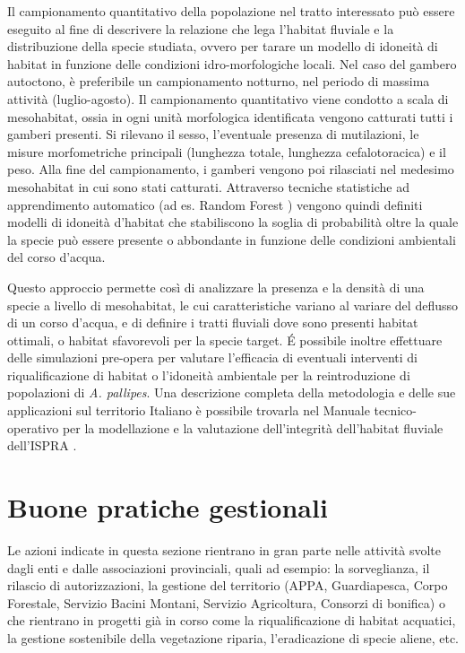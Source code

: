 \documentclass[11pt,a4paper,italian,twoside,openany]{memoir}
\begin{document}
Il campionamento quantitativo della popolazione nel tratto interessato può essere eseguito al fine di descrivere la relazione che lega l'habitat fluviale e la distribuzione della specie studiata, ovvero per tarare un modello di idoneità di habitat in funzione delle condizioni idro-morfologiche locali. Nel caso del gambero autoctono, è preferibile un campionamento notturno, nel periodo di massima attività (luglio-agosto). Il campionamento quantitativo viene condotto a scala di mesohabitat, ossia in ogni unità morfologica identificata vengono catturati tutti i gamberi presenti. Si rilevano il sesso, l'eventuale presenza di mutilazioni, le misure morfometriche principali (lunghezza totale, lunghezza cefalotoracica) e il peso. Alla fine del campionamento, i gamberi vengono poi rilasciati nel medesimo mesohabitat in cui sono stati catturati. Attraverso tecniche statistiche ad apprendimento automatico (ad es. Random Forest \cite{Breiman 2001}) vengono quindi definiti modelli di idoneità d'habitat che stabiliscono la soglia di probabilità oltre la quale la specie può essere presente o abbondante in funzione delle condizioni ambientali del corso d'acqua. 

Questo approccio permette così di analizzare la presenza e la densità di una specie a livello di mesohabitat, le cui caratteristiche variano al variare del deflusso di un corso d'acqua, e di definire i tratti fluviali dove sono presenti habitat ottimali, o habitat sfavorevoli per la specie target. É possibile inoltre effettuare delle simulazioni pre-opera per valutare l'efficacia di eventuali interventi di riqualificazione di habitat o l'idoneità ambientale per la reintroduzione di popolazioni di \emph{A. pallipes}. Una descrizione completa della metodologia e delle sue applicazioni sul territorio Italiano è possibile trovarla nel Manuale tecnico-operativo per la modellazione e la valutazione dell'integrità dell'habitat fluviale dell'ISPRA \cite{Vezza 2017}.

\section{Buone pratiche gestionali}
Le azioni indicate in questa sezione rientrano in gran parte nelle attività svolte dagli enti e dalle associazioni provinciali, quali ad esempio: la sorveglianza, il rilascio di autorizzazioni, la gestione del territorio (APPA, Guardiapesca, Corpo Forestale, Servizio Bacini Montani, Servizio Agricoltura, Consorzi di bonifica) o che rientrano in progetti già in corso come la riqualificazione di habitat acquatici, la gestione sostenibile della vegetazione riparia, l'eradicazione di specie aliene, etc.
\end{document}
